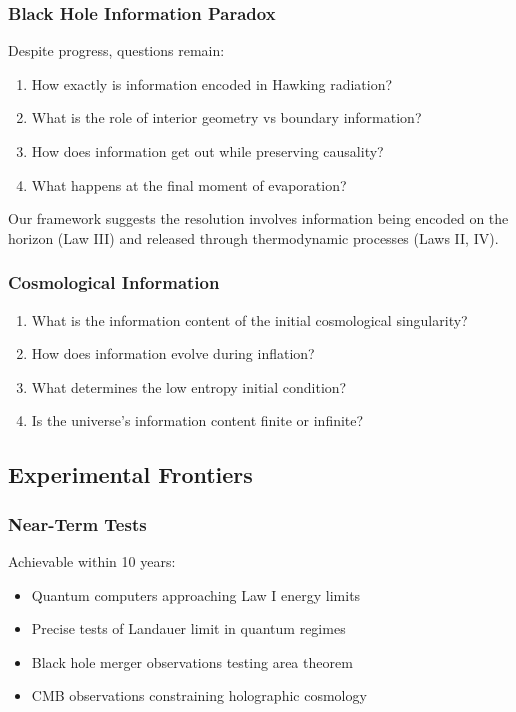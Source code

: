 \documentclass[11pt,a4paper]{article}
\theoremstyle{plain}
\theoremstyle{definition}
\theoremstyle{remark}
\begin{document}
\subsubsection{Black Hole Information Paradox}

Despite progress, questions remain:

\begin{enumerate}[leftmargin=*]
\item How exactly is information encoded in Hawking radiation?
\item What is the role of interior geometry vs boundary information?
\item How does information get out while preserving causality?
\item What happens at the final moment of evaporation?
\end{enumerate}

Our framework suggests the resolution involves information being encoded on the horizon (Law III) and released through thermodynamic processes (Laws II, IV).

\subsubsection{Cosmological Information}

\begin{enumerate}[leftmargin=*]
\item What is the information content of the initial cosmological singularity?
\item How does information evolve during inflation?
\item What determines the low entropy initial condition?
\item Is the universe's information content finite or infinite?
\end{enumerate}

\subsection{Experimental Frontiers}

\subsubsection{Near-Term Tests}

Achievable within 10 years:

\begin{itemize}[leftmargin=*]
\item Quantum computers approaching Law I energy limits
\item Precise tests of Landauer limit in quantum regimes
\item Black hole merger observations testing area theorem
\item CMB observations constraining holographic cosmology
\end{itemize}
\end{document}

